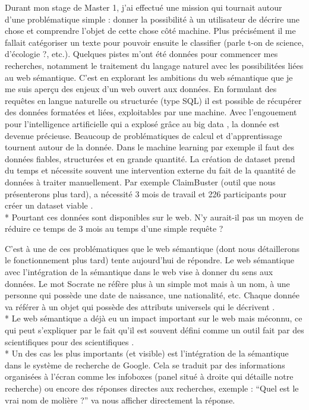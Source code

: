 Durant mon stage de Master 1, j'ai effectué une mission qui tournait autour d'une problématique simple : donner la possibilité à un utilisateur de décrire une chose et comprendre l'objet de cette chose côté machine. Plus précisément il me fallait catégoriser un texte pour pouvoir ensuite le classifier (parle t-on de science, d'écologie ?, etc.). Quelques pistes m'ont été données pour commencer mes recherches, notamment le traitement du langage naturel avec les possibilitées liées au web sémantique. C'est en explorant les ambitions du web sémantique que je me suis aperçu des enjeux d'un web ouvert aux données. En formulant des requêtes en langue naturelle ou structurée (type SQL) il est possible de récupérer des données formatées et liées, exploitables par une machine. Avec l'engouement pour l'intelligence artificielle qui a explosé grâce au big data \cite{sh}, la donnée est devenue précieuse. Beaucoup de problématiques de calcul et d'apprentissage tournent autour de la donnée. Dans le machine learning par exemple il faut des données fiables, structurées et en grande quantité. La création de dataset prend du temps et nécessite souvent une intervention externe du fait de la quantité de données à traiter manuellement. Par exemple ClaimBuster (outil que nous présenterons plus tard), a nécessité 3 mois de travail et 226 participants pour créer un dataset viable \cite{hassan2015quest}.
\\*
Pourtant ces données sont disponibles sur le web. N'y aurait-il pas un moyen de réduire ce temps de 3 mois au temps d'une simple requête ?

C'est à une de ces problématiques que le web sémantique (dont nous détaillerons le fonctionnement plus tard) tente aujourd'hui de répondre. Le web sémantique avec l'intégration de la sémantique dans le web vise à donner du sens aux données. Le mot Socrate ne réfère plus à un simple mot mais à un nom, à une personne qui possède une date de naissance, une nationalité, etc. Chaque donnée va référer à un objet qui possède des attributs universels qui le décrivent \cite{schemaPerson}.
\\*
Le web sémantique a déjà eu un impact important sur le web mais méconnu, ce qui peut s'expliquer par le fait qu'il est souvent défini comme un outil fait par des scientifiques pour des scientifiques \cite{semantic_web_has_failed}.
\\*
Un des cas les plus importants (et visible) est l'intégration de la sémantique dans le système de recherche de Google. Cela se traduit par des informations organisées à l'écran comme les infoboxes (panel situé à droite qui détaille notre recherche) ou encore des réponses directes aux recherches, exemple : \enquote{Quel est le vrai nom de molière ?} va nous afficher directement la réponse.


